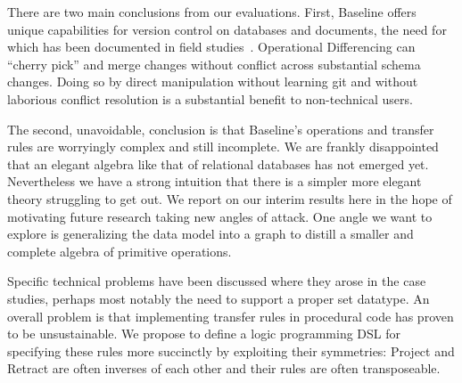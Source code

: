 \documentclass[english,submission]{programming}
\theoremstyle{definition}
\begin{document}
There are two main conclusions from our evaluations. First, Baseline offers unique capabilities for version control on databases and documents, the need for which has been documented in field studies~\cite{Burnett14, Basman19}.
Operational Differencing can ``cherry pick'' and merge changes without conflict across substantial schema changes. Doing so by direct manipulation without learning git and without laborious conflict resolution is a substantial benefit to non-technical users.

The second, unavoidable, conclusion is that Baseline's operations and transfer rules are worryingly complex and still incomplete. We are frankly disappointed that an elegant algebra like that of relational databases has not emerged yet. Nevertheless we have a strong intuition that there is a simpler more elegant theory struggling to get out. We report on our interim results here in the hope of motivating future research taking new angles of attack. One angle we want to explore is generalizing the data model into a graph to distill a smaller and complete algebra of primitive operations.

Specific technical problems have been discussed where they arose in the case studies, perhaps most notably the need to support a proper set datatype. An overall problem is that implementing transfer rules in procedural code has proven to be unsustainable. We propose to define a logic programming DSL for specifying these rules more succinctly by exploiting their symmetries: \textsf{Project} and  \textsf{Retract} are often inverses of each other and their rules are often transposeable.



\end{document}
